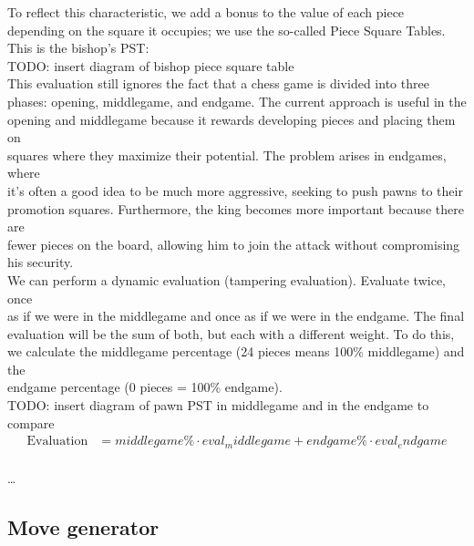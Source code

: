 To reflect this characteristic, we add a bonus to the value of each piece\\
depending on the square it occupies; we use the so-called Piece Square Tables.\\
This is the bishop's PST:\\

TODO: insert diagram of bishop piece square table\\

This evaluation still ignores the fact that a chess game is divided into three\\
phases: opening, middlegame, and endgame. The current approach is useful in the\\
opening and middlegame because it rewards developing pieces and placing them on\\
squares where they maximize their potential. The problem arises in endgames, where\\
it's often a good idea to be much more aggressive, seeking to push pawns to their\\
promotion squares. Furthermore, the king becomes more important because there are\\
fewer pieces on the board, allowing him to join the attack without compromising\\
his security.\\

We can perform a dynamic evaluation (tampering evaluation). Evaluate twice, once\\
as if we were in the middlegame and once as if we were in the endgame. The final\\
evaluation will be the sum of both, but each with a different weight. To do this,\\
we calculate the middlegame percentage (24 pieces means 100\% middlegame) and the\\
endgame percentage (0 pieces = 100\% endgame).\\

TODO: insert diagram of pawn PST in middlegame and in the endgame to compare\\

\begin{align*}
\text{Evaluation} &= middlegame\% \cdot eval_middlegame + endgame\% \cdot eval_endgame \\
\end{align*}

\ldots

\subsection{Move generator}

